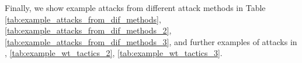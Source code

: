 Finally, we show example attacks from different attack methods in Table \ref{tab:example_attacks_from_dif_methods}, \ref{tab:example_attacks_from_dif_methods_2}, \ref{tab:example_attacks_from_dif_methods_3}, and further examples of \method attacks in , \ref{tab:example_wt_tactics_2}, \ref{tab:example_wt_tactics_3}. 



